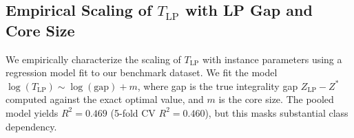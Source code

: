 \documentclass[conference]{IEEEtran} \IEEEoverridecommandlockouts
\begin{document}
\begin{table}[htbp]
\caption{Category (b): Cutoffs Reached}
\label{tab:ortools_cat_b}
\begin{center}
\end{center}
\end{table}


\subsection{Empirical Scaling of $T_{\text{LP}}$ with LP Gap and Core Size}

We empirically characterize the scaling of $T_{\text{LP}}$ with instance parameters using a regression model fit to our benchmark dataset. We fit the model $\log(T_{\text{LP}}) \sim \log(\text{gap}) + m$, where gap is the true integrality gap $Z_{\text{LP}} - Z^*$ computed against the exact optimal value, and $m$ is the core size. The pooled model yields $R^2 = 0.469$ (5-fold CV $R^2 = 0.460$), but this masks substantial class dependency.

\begin{table}[htbp]
\caption{Per-Class Regression Fits for $\log(T_{\text{LP}}) \sim \log(\text{gap}) + m$}
\label{tab:tlp_regression}
\begin{center}
\end{center}
\end{table}
\end{document}
